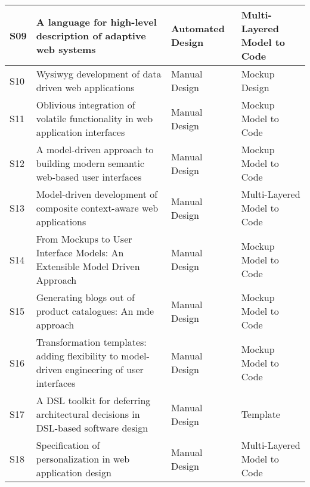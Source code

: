 \begin{table*}[ht!]
\begin{tabular}{ | p{0.3cm} | p{9.5cm} | p{2.2cm} |  p{4.2cm} |}
S09 &  A language for high-level description of adaptive web systems~\cite{sadat2008language} & Automated Design & Multi-Layered Model to Code \\ \hline

S10 &  Wysiwyg development of data driven web applications~\cite{Yang08} & Manual Design & Mockup Design \\ \hline

S11 &  Oblivious integration of volatile functionality in web application interfaces~\cite{Ginzburg09} & Manual Design & Mockup Model to Code \\ \hline

S12 &  A model-driven approach to building modern semantic web-based user interfaces~\cite{chavarriaga2009model} & Manual Design & Mockup Model to Code \\ \hline

S13 &  Model-driven development of composite context-aware web applications~\cite{KAPITSAKI20091244} & Manual Design & Multi-Layered Model to Code \\ \hline		


S14 &  From Mockups to User Interface Models: An Extensible Model Driven Approach~\cite{Rivero10} & Manual Design  & Mockup Model to Code	\\ \hline 


S15 &  Generating blogs out of product catalogues: An mde approach~\cite{diaz2010generating} & Manual Design & Mockup Model to Code \\ \hline

S16 &  Transformation templates:  adding flexibility to model-driven engineering of user interfaces~\cite{Aquino10} & Manual Design & Mockup Model to Code \\ \hline

S17 &  A DSL toolkit for deferring architectural decisions in DSL-based software design~\cite{ZDUN2010733} & Manual Design & Template \\ \hline 

S18 & Specification of personalization in web application design~\cite{GARRIGOS2010991}	& Manual Design & Multi-Layered Model to Code  \\ \hline	


\end{tabular}
\end{table*}
